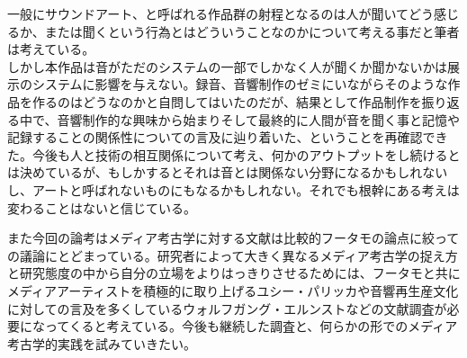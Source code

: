 \documentclass[a4paper,report]{jsbook}
\begin{document}
一般にサウンドアート、と呼ばれる作品群の射程となるのは人が聞いてどう感じるか、または聞くという行為とはどういうことなのかについて考える事だと筆者は考えている。\\
しかし本作品は音がただのシステムの一部でしかなく人が聞くか聞かないかは展示のシステムに影響を与えない。録音、音響制作のゼミにいながらそのような作品を作るのはどうなのかと自問してはいたのだが、結果として作品制作を振り返る中で、音響制作的な興味から始まりそして最終的に人間が音を聞く事と記憶や記録することの関係性についての言及に辿り着いた、ということを再確認できた。今後も人と技術の相互関係について考え、何かのアウトプットをし続けるとは決めているが、もしかするとそれは音とは関係ない分野になるかもしれないし、アートと呼ばれないものにもなるかもしれない。それでも根幹にある考えは変わることはないと信じている。

また今回の論考はメディア考古学に対する文献は比較的フータモの論点に絞っての議論にとどまっている。研究者によって大きく異なるメディア考古学の捉え方と研究態度の中から自分の立場をよりはっきりさせるためには、フータモと共にメディアアーティストを積極的に取り上げるユシー・パリッカや音響再生産文化に対しての言及を多くしているウォルフガング・エルンストなどの文献調査が必要になってくると考えている。今後も継続した調査と、何らかの形でのメディア考古学的実践を試みていきたい。


\printbibliography[title = 参考文献]
\end{document}
